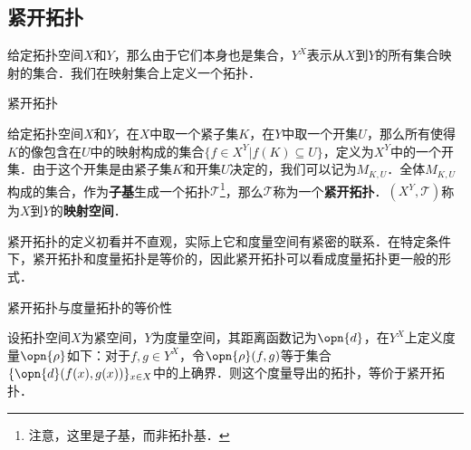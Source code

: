\subsection{紧开拓扑}

给定拓扑空间$X$和$Y$，那么由于它们本身也是集合，$Y^X$表示从$X$到$Y$的所有集合映射的集合．我们在映射集合上定义一个拓扑．

\begin{definition}{紧开拓扑}

给定拓扑空间$X$和$Y$，在$X$中取一个紧子集$K$，在$Y$中取一个开集$U$，那么所有使得$K$的像包含在$U$中的映射构成的集合$\{f\in X^Y|f(K)\subseteq U\}$，定义为$X^Y$中的一个开集．由于这个开集是由紧子集$K$和开集$U$决定的，我们可以记为$M_{K, U}$．全体$M_{K, U}$构成的集合，作为\textbf{子基}生成一个拓扑$\mathcal{T}$\footnote{注意，这里是子基，而非拓扑基．}，那么$\mathcal{T}$称为一个\textbf{紧开拓扑}．$(X^Y, \mathcal{T})$称为$X$到$Y$的\textbf{映射空间}．

\end{definition}

紧开拓扑的定义初看并不直观，实际上它和度量空间有紧密的联系．在特定条件下，紧开拓扑和度量拓扑是等价的，因此紧开拓扑可以看成度量拓扑更一般的形式．

\begin{theorem}{紧开拓扑与度量拓扑的等价性}

设拓扑空间$X$为紧空间，$Y$为度量空间，其距离函数记为$\opn{d}$，在$Y^X$上定义度量$\opn{\rho}$如下：对于$f, g\in Y^X$，令$\opn{\rho}(f, g)$等于集合$\{\opn{d}(f(x), g(x))\}_{x\in X}$中的上确界．则这个度量导出的拓扑，等价于紧开拓扑．

\end{theorem}

